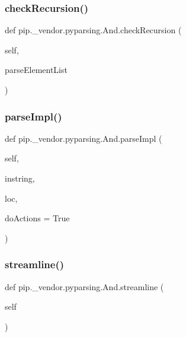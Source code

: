 \subsubsection{\texorpdfstring{check\+Recursion()}{checkRecursion()}}
{\footnotesize\ttfamily def pip.\+\_\+vendor.\+pyparsing.\+And.\+check\+Recursion (\begin{DoxyParamCaption}\item[{}]{self,  }\item[{}]{parse\+Element\+List }\end{DoxyParamCaption})}

\mbox{\label{classpip_1_1__vendor_1_1pyparsing_1_1And_aa2df02d7b498397033a1eddfa4c0917b}} 
\subsubsection{\texorpdfstring{parse\+Impl()}{parseImpl()}}
{\footnotesize\ttfamily def pip.\+\_\+vendor.\+pyparsing.\+And.\+parse\+Impl (\begin{DoxyParamCaption}\item[{}]{self,  }\item[{}]{instring,  }\item[{}]{loc,  }\item[{}]{do\+Actions = {\ttfamily True} }\end{DoxyParamCaption})}

\mbox{\label{classpip_1_1__vendor_1_1pyparsing_1_1And_abe50611492ed4fc35014a4ac621814b1}} 
\subsubsection{\texorpdfstring{streamline()}{streamline()}}
{\footnotesize\ttfamily def pip.\+\_\+vendor.\+pyparsing.\+And.\+streamline (\begin{DoxyParamCaption}\item[{}]{self }\end{DoxyParamCaption})}



